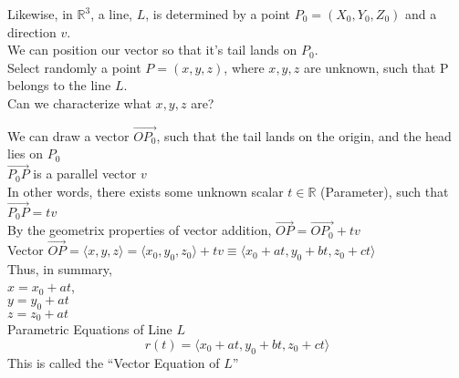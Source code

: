 \documentclass[]{article}
\begin{document}
Likewise, in $\mathbb{R}^3$, a line, $L$,  is determined by a point $P_0 = (X_0, Y_0, Z_0)$ and a direction $v$.\\
We can position our vector so that it's tail lands on $P_0$.\\
Select randomly a point $P = (x, y, z)$, where $x, y, z$ are unknown, such that P belongs to the line $L$.\\
Can we characterize what $x, y, z$ are?

We can draw a vector $\overrightarrow{OP_0}$, such that the tail lands on the origin, and the head lies on $P_0$\\
$\overrightarrow{P_0P}$ is a parallel vector $v$\\
In other words, there exists some unknown scalar $t \in \mathbb{R}$ (Parameter), such that $\overrightarrow{P_0P}=tv$\\
By the geometrix properties of vector addition, $\overrightarrow{OP} = \overrightarrow{OP_0} + tv$\\
Vector $\overrightarrow{OP} = \langle x,y,z \rangle = \langle x_0, y_0, z_0\rangle + tv \equiv \langle x_0+at, y_0+bt, z_0+ct\rangle$\\
Thus, in summary,\\
$x = x_0 + at$,\\
$y = y_0 + at$\\
$z = z_0 + at$\\
Parametric Equations of Line $L$\\

\begin{equation*}
    r(t) = \langle x_0+at, y_0+bt, z_0+ct\rangle
\end{equation*}
This is called the ``Vector Equation of $L$''
\end{document}
